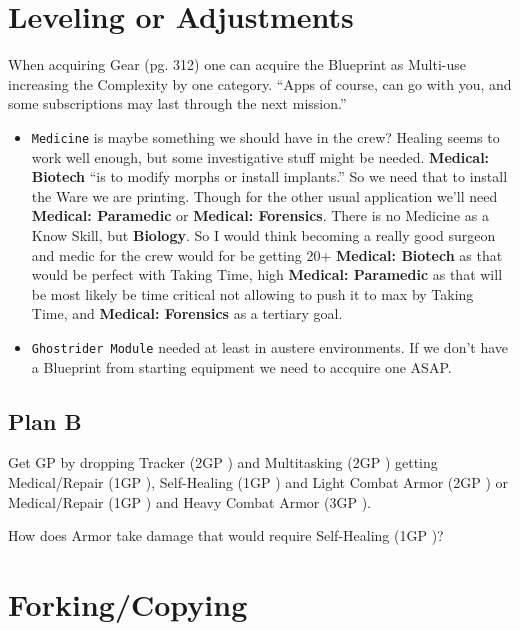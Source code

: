 \section{Leveling or Adjustments}

When acquiring Gear (pg. 312) one can acquire the \gls{Blueprint} as Multi-use increasing the Complexity by one category. “Apps of course, can go with you, and some subscriptions may last through the next mission.” \citep[p. 313]{ep2e_1.1_2019}

\begin{itemize}
    \item \texttt{Medicine} is maybe something we should have in the crew? Healing seems to work well enough, but some investigative stuff might be needed. \textbf{Medical: Biotech} “is to modify morphs or install implants.” \citep[p. 51]{ep2e_1.1_2019} So we need that to install the Ware we are printing. Though for the other usual application we'll need \textbf{Medical: Paramedic} or \textbf{Medical: Forensics}. There is no Medicine as a Know Skill, but \textbf{Biology}. So I would think becoming a really good surgeon and medic for the crew would for \egr{} be getting 20+ \textbf{Medical: Biotech} as that would be perfect with Taking Time, high \textbf{Medical: Paramedic} as that will be most likely be time critical not allowing to push it to max by Taking Time, and \textbf{Medical: Forensics} as a tertiary goal.
    \item \texttt{\gls{Ghostrider Module}} needed at least in austere environments. If we don't have a \gls{Blueprint} from starting equipment we need to accquire one ASAP.
\end{itemize}

\subsection{Plan B}

Get GP by dropping Tracker (2GP \citep[p. 326]{ep2e_1.1_2019}) and Multitasking (2GP \citep[p. 320]{ep2e_1.1_2019}) getting Medical/Repair (1GP \citep[p. 217]{ep2e_1.1_2019}), Self-Healing (1GP \citep[p. 217]{ep2e_1.1_2019}) and Light Combat Armor (2GP \citep[p. 215]{ep2e_1.1_2019}) or Medical/Repair (1GP \citep[p. 217]{ep2e_1.1_2019}) and \gls{Heavy Combat Armor} (3GP \citep[p. 215]{ep2e_1.1_2019}).

How does Armor take damage that would require Self-Healing (1GP \citep[p. 217]{ep2e_1.1_2019})?


\section{Forking/Copying}

